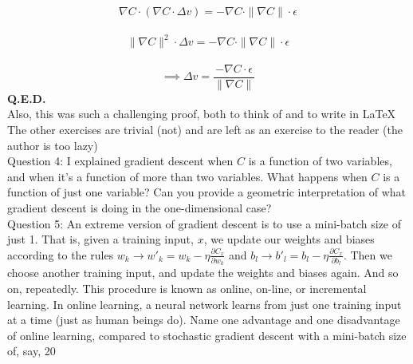 \documentclass[18pt]{article}
\begin{document}
\begin{equation}
\nabla C \cdot ({\nabla C\cdot \Delta v})=-\nabla C \cdot \|\nabla C\| \cdot \epsilon
\end{equation}\\
$$
\|\nabla C\|^2\cdot \Delta v=-\nabla C \cdot \|\nabla C\| \cdot \epsilon
$$\\
$$\implies \Delta v = \frac{-\nabla C \cdot \epsilon}{\|\nabla C\|}$$
\textbf{Q.E.D.}\\ Also, this was such a challenging proof, both to think of and to write in \LaTeX\ \\


The other exercises are trivial (not) and are left as an exercise to the reader (the author is too lazy)\\

Question 4: I explained gradient descent when $C$
 is a function of two variables, and when it's a function of more than two variables. What happens when $C$
 is a function of just one variable? Can you provide a geometric interpretation of what gradient descent is doing in the one-dimensional case?\\

 Question 5: An extreme version of gradient descent is to use a mini-batch size of just 1. That is, given a training input, $x$, we update our weights and biases according to the rules $w_k \rightarrow w'_k = w_k - \eta \frac{\partial C_x}{\partial w_k}$ and $b_l \rightarrow b'_l = b_l - \eta \frac{\partial C_x}{\partial b_l}$. Then we choose another training input, and update the weights and biases again. And so on, repeatedly. This procedure is known as online, on-line, or incremental learning. In online learning, a neural network learns from just one training input at a time (just as human beings do). Name one advantage and one disadvantage of online learning, compared to stochastic gradient descent with a mini-batch size of, say, 20
\end{document}
